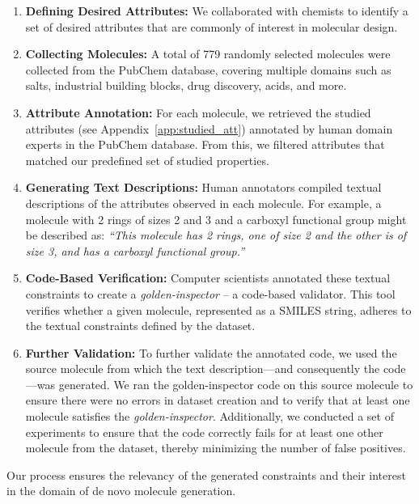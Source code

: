 \documentclass[10pt]{article} %
\begin{document}
    \begin{enumerate}
        \item \textbf{Defining Desired Attributes:} We collaborated with chemists to identify a set of desired attributes that are commonly of interest in molecular design.
        
        \item \textbf{Collecting Molecules:} A total of 779 randomly selected molecules were collected from the PubChem database, covering multiple domains such as salts, industrial building blocks, drug discovery, acids, and more.
        
        \item \textbf{Attribute Annotation:} For each molecule, we retrieved the studied attributes (see Appendix~\ref{app:studied_att}) annotated by human domain experts in the PubChem database. From this, we filtered attributes that matched our predefined set of studied properties.
        
        \item \textbf{Generating Text Descriptions:} Human annotators compiled textual descriptions of the attributes observed in each molecule. For example, a molecule with 2 rings of sizes 2 and 3 and a carboxyl functional group might be described as: \emph{``This molecule has 2 rings, one of size 2 and the other is of size 3, and has a carboxyl functional group.''}
        
        \item \textbf{Code-Based Verification:} Computer scientists annotated these textual constraints to create a \emph{golden-inspector} – a code-based validator. This tool verifies whether a given molecule, represented as a SMILES string, adheres to the textual constraints defined by the dataset.
    
        \item \textbf{Further Validation:} To further validate the annotated code, we used the source molecule from which the text description—and consequently the code—was generated. We ran the golden-inspector code on this source molecule to ensure there were no errors in dataset creation and to verify that at least one molecule satisfies the \emph{golden-inspector}. Additionally, we conducted a set of experiments to ensure that the code correctly fails for at least one other molecule from the dataset, thereby minimizing the number of false positives.
    \end{enumerate}
    
        Our process ensures the relevancy of the generated constraints and their interest in the domain of de novo molecule generation.
    
\end{document}
